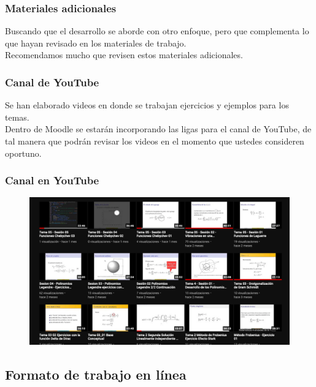 \begin{frame}
\frametitle{Materiales adicionales}
Buscando que el desarrollo se aborde con otro enfoque, pero que complementa lo que hayan revisado en los materiales de trabajo.
\\
\bigskip
Recomendamos mucho que revisen estos materiales adicionales.
\end{frame}
\begin{frame}
\frametitle{Canal de YouTube}
Se han elaborado videos en donde se trabajan ejercicios y ejemplos para los temas.
\\
\bigskip
\pause
Dentro de Moodle se estarán incorporando las ligas para el canal de YouTube, de tal manera que podrán revisar los videos en el momento que ustedes consideren oportuno.
\end{frame}
\begin{frame}
\frametitle{Canal en YouTube}
\begin{figure}[H]
  \centering
  \includegraphics[scale=0.25]{Imagenes/canal_videos.png}
\end{figure}
\end{frame}

\subsection{Formato de trabajo en línea}

